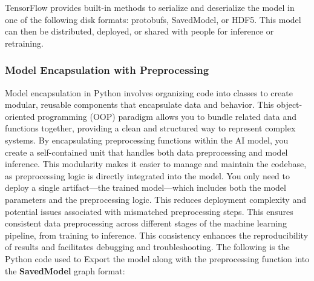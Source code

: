 \documentclass[a4paper]{report}
\begin{document}
{TensorFlow provides built-in methods to serialize and deserialize the model in one of the following disk formats: protobufs, SavedModel, or HDF5. This model can then be distributed, deployed, or shared with people for inference or retraining.
\subsubsection{Model Encapsulation with Preprocessing}
Model encapsulation in Python involves organizing code into classes to create modular, reusable components that encapsulate data and behavior. This object-oriented programming (OOP) paradigm allows you to bundle related data and functions together, providing a clean and structured way to represent complex systems.  By encapsulating preprocessing functions within the AI model, you create a self-contained unit that handles both data preprocessing and model inference. This modularity makes it easier to manage and maintain the codebase, as preprocessing logic is directly integrated into the model. You only need to deploy a single artifact—the trained model—which includes both the model parameters and the preprocessing logic. This reduces deployment complexity and potential issues associated with mismatched preprocessing steps. This ensures consistent data preprocessing across different stages of the machine learning pipeline, from training to inference. This consistency enhances the reproducibility of results and facilitates debugging and troubleshooting.
\newpage
The following is the Python code used to Export the model along with the preprocessing function into the \textbf{SavedModel} graph format:
\begin{center}
\end{center}}
\end{document}
